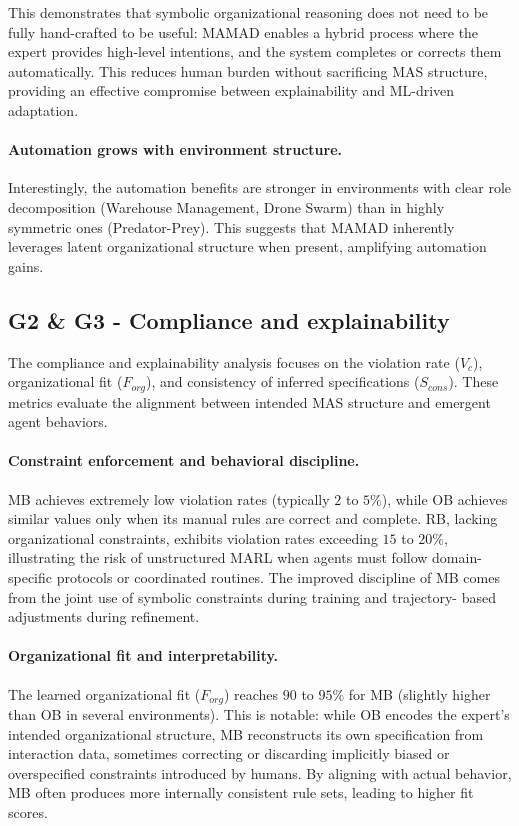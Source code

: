 \documentclass[pdflatex,sn-mathphys-num]{sn-jnl}%
\theoremstyle{thmstyleone}%
\theoremstyle{thmstyletwo}%
\theoremstyle{thmstylethree}%
\begin{document}
This demonstrates that symbolic organizational reasoning does not need to be
fully hand-crafted to be useful: MAMAD enables a hybrid process where the expert
provides high-level intentions, and the system completes or corrects them
automatically. This reduces human burden without sacrificing MAS structure,
providing an effective compromise between explainability and ML-driven
adaptation.

\paragraph*{Automation grows with environment structure.}
Interestingly, the automation benefits are stronger in environments with clear
role decomposition (Warehouse Management, Drone Swarm) than in highly
symmetric ones (Predator-Prey). This suggests that MAMAD inherently leverages
latent organizational structure when present, amplifying automation gains.


\subsection{G2 \& G3 - Compliance and explainability}

The compliance and explainability analysis focuses on the violation rate ($V_c$),
organizational fit ($F_{org}$), and consistency of inferred specifications
($S_{cons}$). These metrics evaluate the alignment between intended MAS
structure and emergent agent behaviors.

\paragraph*{Constraint enforcement and behavioral discipline.}
MB achieves extremely low violation rates (typically $2$ to $5\%$), while OB
achieves similar values only when its manual rules are correct and complete.
RB, lacking organizational constraints, exhibits violation rates exceeding
$15$ to $20\%$, illustrating the risk of unstructured MARL when agents must follow
domain-specific protocols or coordinated routines. The improved discipline of MB
comes from the joint use of symbolic constraints during training and trajectory-
based adjustments during refinement.

\paragraph*{Organizational fit and interpretability.}
The learned organizational fit ($F_{org}$) reaches $90$ to $95\%$ for MB (slightly
higher than OB in several environments). This is notable: while OB encodes the
expert's intended organizational structure, MB reconstructs its own specification
from interaction data, sometimes correcting or discarding implicitly biased or
overspecified constraints introduced by humans. By aligning with actual
behavior, MB often produces more internally consistent rule sets, leading to
higher fit scores.
\end{document}
